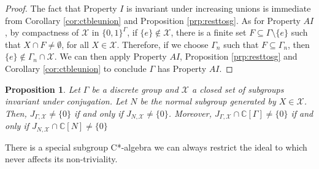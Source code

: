 \documentclass[a4paper, 12pt]{amsart}
\newtheorem{prp}[thm]{Proposition}
\theoremstyle{definition}
\theoremstyle{remark}
\numberwithin{equation}{section}
\begin{document}
\begin{proof}
    The fact that Property $I$ is invariant under increasing unions is immediate from Corollary \ref{cor:ctbleunion} and Proposition \ref{prp:resttosg}. As for Property $AI$, by compactness of $\mathcal{X}$ in $\{0,1\}^{\Gamma}$, if $\{e\}\notin \mathcal{X}$, there is a finite set $F\subseteq \Gamma\setminus \{e\}$ such that $X\cap F\neq \emptyset$, for all $X\in\mathcal{X}$. Therefore, if we choose $\Gamma_{n}$ such that $F\subseteq \Gamma_{n}$, then $\{e\}\notin \Gamma_{n}\cap\mathcal{X}$. We can then apply Property $AI$, Proposition \ref{prp:resttosg} and Corollary \ref{cor:ctbleunion} to conclude $\Gamma$ has Property $AI$.
\end{proof}

\begin{prp}
\label{prp:videalredtonsg}
    Let $\Gamma$ be a discrete group and $\mathcal{X}$ a closed set of subgroups invariant under conjugation. Let $N$ be the normal subgroup generated by $X\in\mathcal{X}$. Then, $J_{\Gamma,\mathcal{X}}\neq \{0\}$ if and only if $J_{N,\mathcal{X}}\neq \{0\}$. Moreover, $J_{\Gamma,\mathcal{X}}\cap \mathbb{C}[\Gamma]\neq\{0\}$ if and only if $J_{N,\mathcal{X}}\cap\mathbb{C}[N] \neq \{0\}$
\end{prp}

There is a special subgroup C*-algebra we can always restrict the ideal to which never affects its non-triviality.
\end{document}
